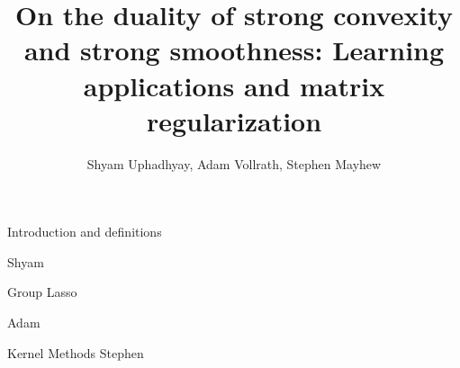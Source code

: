 \documentclass[11pt]{beamer}
\author{}
\title{On the duality of strong convexity and strong smoothness: Learning applications and matrix regularization}
\date{Shyam Uphadhyay, Adam Vollrath, Stephen Mayhew}
\begin{document}
{\nologo
\begin{frame}
\titlepage
\end{frame}
}


\begin{frame}{Introduction and definitions}

Shyam

\end{frame}

\begin{frame}{Group Lasso}

Adam

\end{frame}

\begin{frame}{Kernel Methods}
Stephen

\end{frame}
\end{document}
